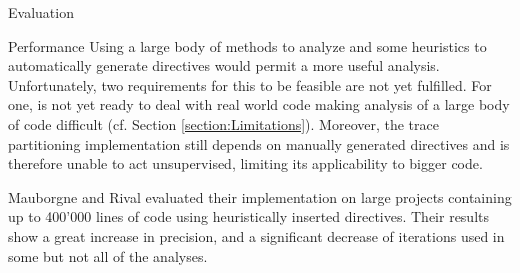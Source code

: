 \begin{chapter}{Evaluation}
\begin{section}{Performance}
		Using a large body of methods to analyze and some heuristics to automatically generate directives would permit a more useful analysis. Unfortunately, two requirements for this to be feasible are not yet fulfilled. For one, \sample is not yet ready to deal with real world code making analysis of a large body of code difficult (cf. Section \ref{section:Limitations}). Moreover, the trace partitioning implementation still depends on manually generated directives and is therefore unable to act unsupervised, limiting its applicability to bigger code.

		Mauborgne and Rival evaluated their implementation on large projects containing up to 400'000 lines of code using heuristically inserted directives. Their results show a great increase in precision, and a significant decrease of iterations used in some but not all of the analyses.
	\end{section}
\end{chapter}
